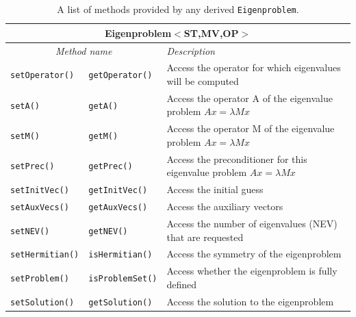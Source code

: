 \documentclass[acmtoms]{acmtrans2m}
\newcommand{\aspace}[1]{\texttt{#1}}
\begin{document}
\begin{table}[htb]
\begin{center}
  \caption{A list of methods provided by any derived \aspace{Eigenproblem}.} 
\label{tab:anasazi:eigenproblem}
\begin{tabular}{| p{2cm}  p{2cm} | p{6cm} |}
\hline
\multicolumn{3}{|c|}{\textbf{Eigenproblem$<$ST,MV,OP$>$}} \\\hline
\multicolumn{2}{|c|}{\emph{Method name}} & \emph{Description} \\
\hline
{\tt setOperator()}&{\tt getOperator()}    & Access the operator for which eigenvalues will be computed \\
{\tt setA()}&{\tt getA()}                  & Access the operator A of the eigenvalue problem $Ax=\lambda Mx$  \\
{\tt setM()}&{\tt getM()}                  & Access the operator M of the eigenvalue problem $Ax=\lambda Mx$  \\
{\tt setPrec()}&{\tt getPrec()}            & Access the preconditioner for this eigenvalue problem $Ax=\lambda Mx$  \\
{\tt setInitVec()}&{\tt getInitVec()}      & Access the initial guess \\
{\tt setAuxVecs()}&{\tt getAuxVecs()}      & Access the auxiliary vectors \\
{\tt setNEV()}&{\tt getNEV()}              & Access the number of eigenvalues (NEV) that are requested  \\
{\tt setHermitian()}&{\tt isHermitian()}   & Access the symmetry of the eigenproblem \\
{\tt setProblem()}&{\tt isProblemSet()}    & Access whether the eigenproblem is fully defined  \\
{\tt setSolution()}&{\tt getSolution()}    & Access the solution to the eigenproblem \\
\hline
\end{tabular}
\end{center}
\end{table}
\end{document}
